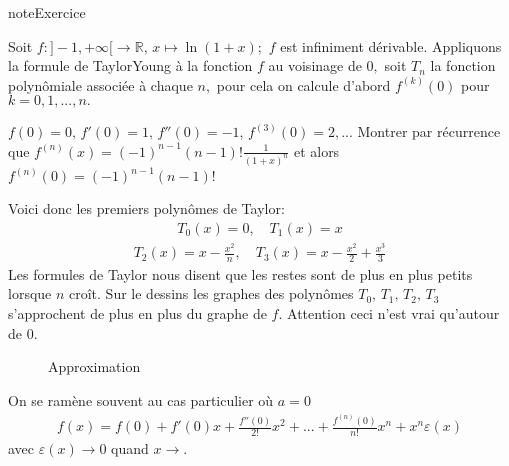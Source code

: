 \documentclass[letterpaper,10pt,french]{jupyterBook}
\let\sphinxpxdimen\pdfpxdimen\else\newdimen\sphinxpxdimen
\begin{document}
\begin{sphinxadmonition}{note}{Exercice}

\sphinxAtStartPar
Soit \(f :]-1,+\infty[\rightarrow \mathbb{R},\, x \mapsto\ln(1+x);\) \(f\) est infiniment dérivable. Appliquons la formule de Taylor\sphinxhyphen{}Young à la fonction \(f\) au voisinage de \(0,\) soit \(T_n\) la fonction polynômiale associée à chaque \(n,\) pour cela on calcule d’abord \(f^{(k)}(0)\) pour \(k=0,1,...,n.\)

\sphinxAtStartPar
\(f(0)=0,\,f'(0)=1,\,f''(0)=-1,\,f^{(3)}(0)=2,...\) Montrer par récurrence que \(f^{(n)}(x)=(-1)^{n-1}(n-1)!\frac{1}{(1+x)^n}\) et alors \(f^{(n)}(0)=(-1)^{n-1}(n-1)!\)

\sphinxAtStartPar
Voici donc les premiers polynômes de Taylor:
\begin{equation*}
\begin{split}
T_0(x)=0,\quad T_1(x)=x
\end{split}
\end{equation*}\begin{equation*}
\begin{split}
T_2(x)=x-\frac{x^2}{n},\quad T_3(x)=x-\frac{x^2}{2}+\frac{x^3}{3}
\end{split}
\end{equation*}
\sphinxAtStartPar
Les formules de Taylor nous disent que les restes sont de plus en plus petits lorsque \(n\) croît. Sur le dessins les graphes
des polynômes \(T_0,\,T_1,\,T_2,\,T_3\) s’approchent de plus en plus du graphe de \(f.\) Attention ceci n’est vrai qu’autour de \(0.\)
\end{sphinxadmonition}

\begin{figure}[htbp]
\centering
\capstart

\noindent\sphinxincludegraphics[height=150\sphinxpxdimen]{{Approximation2}.png}
\caption{Approximation}\label{\detokenize{dl:directive-fig}}\end{figure}

\sphinxAtStartPar
{} On se ramène souvent au cas particulier où \(a=0\)
\begin{equation*}
\begin{split}
f(x)=f(0)+f'(0)x+\frac{f''(0)}{2!}x^2+...+\frac{f^{(n)}(0)}{n!}x^n+x^n \varepsilon(x)
\end{split}
\end{equation*}
\sphinxAtStartPar
avec \(\varepsilon(x)\rightarrow0\) quand \(x\rightarrow .\)
\end{document}
